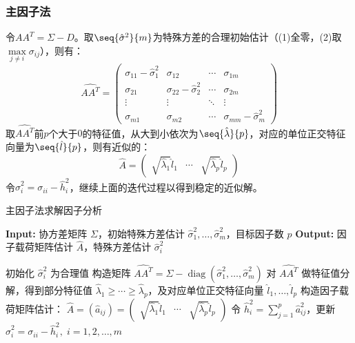 \subsubsection{主因子法}
\begin{method}
	令$AA^T=\Sigma-D$。取$\seq{\hat{\sigma}^2}{m}$为特殊方差的合理初始估计（(1)全零，(2)取$\max\limits_{j\ne i}\sigma_{ij}$），则有：
	\begin{equation*}
		\widehat{AA^T}=
		\begin{pmatrix}
			\sigma_{11}-\hat{\sigma}_1^2 & \sigma_{12} & \cdots & \sigma_{1m} \\
			\sigma_{21} & \sigma_{22}-\hat{\sigma}_2^2 & \cdots & \sigma_{2m} \\
			\vdots & \vdots & \ddots & \vdots \\
			\sigma_{m1} & \sigma_{m2} & \cdots & \sigma_{mm}-\hat{\sigma}_m^2
		\end{pmatrix}
	\end{equation*}
	取$\widehat{AA^T}$前$p$个大于$0$的特征值，从大到小依次为$\seq{\hat{\lambda}}{p}$，对应的单位正交特征向量为$\seq{\hat{l}}{p}$，则有近似的：
	\begin{equation*}
		\hat{A}=
		\begin{pmatrix}
			\sqrt{\hat{\lambda}_1}\hat{l}_1 & \cdots & \sqrt{\hat{\lambda}_p}\hat{l}_p
		\end{pmatrix}
	\end{equation*}
	令$\hat{\sigma}_i^2=\sigma_{ii}-\hat{h}_i^2$，继续上面的迭代过程以得到稳定的近似解。
\end{method}
\begin{algorithm}
	\caption{主因子法求解因子分析}
	\begin{algorithmic}[1]
		\State \textbf{Input:} 协方差矩阵 $\Sigma$，初始特殊方差估计 $\hat{\sigma}^2_1, \ldots, \hat{\sigma}^2_m$，目标因子数 $p$
		\State \textbf{Output:} 因子载荷矩阵估计 $\hat{A}$，特殊方差估计 $\hat{\sigma}_i^2$
		
		\State 初始化 $\hat{\sigma}_i^2$ 为合理值
		\Repeat
		\State 构造矩阵 $\widehat{AA^T} = \Sigma - \operatorname{diag}(\hat{\sigma}_1^2, \ldots, \hat{\sigma}_m^2)$
		\State 对 $\widehat{AA^T}$ 做特征值分解，得到部分特征值 $\hat{\lambda}_1 \geqslant \cdots \geqslant \hat{\lambda}_p$，及对应单位正交特征向量 $\hat{l}_1, \ldots, \hat{l}_p$
		\State 构造因子载荷矩阵估计：
		$
		\hat{A}=(\hat{a}_{ij}) = \begin{pmatrix}
			\sqrt{\hat{\lambda}_1} \hat{l}_1 & \cdots & \sqrt{\hat{\lambda}_p} \hat{l}_p
		\end{pmatrix}
		$
		\State 令 $\hat{h}_i^2 = \sum\limits_{j=1}^p \hat{a}_{ij}^2$，更新 $\hat{\sigma}_i^2 = \sigma_{ii} - \hat{h}_i^2,\;i=1,2,\dots,m$
	\end{algorithmic}
\end{algorithm}
